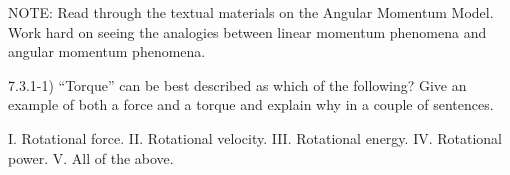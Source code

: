 \label{fnt7.3.1-1}

NOTE: Read through the textual materials on the Angular Momentum Model.  Work hard on seeing the analogies between linear momentum phenomena and angular momentum phenomena.

7.3.1-1) ``Torque'' can be best described as which of the following?  Give an example of both a force and a torque and explain why in a couple of sentences.

I.	Rotational force.	II.	Rotational velocity.
III.	Rotational energy.	IV.	Rotational power.
V.	All of the above.